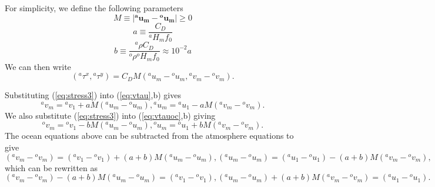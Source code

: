 \documentclass[11pt, a4paper,twoside]{article}
\newcommand{\rhb}[1]{{{}^{#1}\rho}}
\newcommand{\uu}[2]{{{}^{#1}u_{#2}}}
\newcommand{\vv}[2]{{{}^{#1}v_{#2}}}
\newcommand{\HH}[2]{{{}^{#1}H_{#2}}}
\newcommand{\tx}[2]{{}^{#1}\tau^{#2}}
\newcommand{\vc}[1]{\mathbf{#1}}
\numberwithin{equation}{section}
\begin{document}
For simplicity, we define the following parameters 
\[M \equiv \lvert \vc{\uu{a}{m}} - \vc{\uu{o}{m}} \rvert \ge 0\]
\[a \equiv \frac{C_D}{\HH{a}{m}f_0}\]
\[b \equiv \frac{\rhb{a}C_D}{\rhb{o}\HH{o}{m}f_0} \approx 10^{-2}a\]
We can then write
\begin{equation}\label{eq:stress3}
(\tx{a}{x},\tx{a}{y}) = C_D M (\uu{a}{m} - \uu{o}{m},\vv{a}{m} - \vv{o}{m}).
\end{equation}

Substituting (\ref{eq:stress3}) into (\ref{eq:vtau},b) gives
\begin{subequations}
\begin{equation}
\vv{a}{m} = \vv{a}{1} + a M (\uu{a}{m} - \uu{o}{m}),
\end{equation}
\begin{equation}
\uu{a}{m} = \uu{a}{1} - a M (\vv{a}{m} - \vv{o}{m}).
\end{equation}
\end{subequations}
We also substitute (\ref{eq:stress3}) into (\ref{eq:vtauoc},b) giving
\begin{subequations}
\begin{equation}
\vv{o}{m} = \vv{o}{1} - b M (\uu{a}{m} - \uu{o}{m}),
\end{equation}
\begin{equation}
\uu{o}{m} = \uu{o}{1} + b M (\vv{a}{m} - \vv{o}{m}).
\end{equation}
\end{subequations}
The ocean equations above can be subtracted from the atmosphere equations to give
\begin{subequations}
\begin{equation}\label{eq:veldif1}
(\vv{a}{m} - \vv{o}{m}) =  (\vv{a}{1} - \vv{o}{1}) + (a + b) M (\uu{a}{m} - \uu{o}{m}),
\end{equation}
\begin{equation}\label{eq:veldif2}
(\uu{a}{m} - \uu{o}{m}) = (\uu{a}{1} - \uu{o}{1}) - (a + b) M (\vv{a}{m} - \vv{o}{m}),
\end{equation}
\end{subequations}
which can be rewritten as 
\begin{subequations}
\begin{equation}\label{eq:veldif1a}
(\vv{a}{m} - \vv{o}{m}) -  (a + b) M (\uu{a}{m} - \uu{o}{m}) =  (\vv{a}{1} - \vv{o}{1}) ,
\end{equation}
\begin{equation}\label{eq:veldif2a}
(\uu{a}{m} - \uu{o}{m}) + (a + b) M (\vv{a}{m} - \vv{o}{m})= (\uu{a}{1} - \uu{o}{1}).
\end{equation}
\end{subequations}
\end{document}
